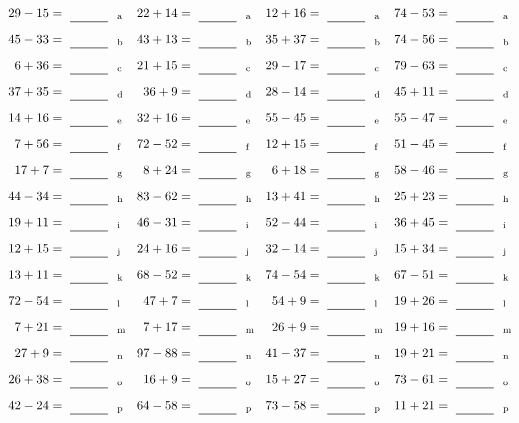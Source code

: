 \documentclass
[
  draft    = true,
  fontsize = 11pt,
  parskip  = half-
]
{scrartcl}
\begin{document}
\clearpage
\begin{align*}
    \pline{29-15}&=\rline{a}
  & \pline{22+14}&=\rline{a}
  & \pline{12+16}&=\rline{a}
  & \pline{74-53}&=\rline{a} \\[1ex]
    \pline{45-33}&=\rline{b}
  & \pline{43+13}&=\rline{b}
  & \pline{35+37}&=\rline{b}
  & \pline{74-56}&=\rline{b} \\[1ex]
    \pline{6+36}&=\rline{c}
  & \pline{21+15}&=\rline{c}
  & \pline{29-17}&=\rline{c}
  & \pline{79-63}&=\rline{c} \\[1ex]
    \pline{37+35}&=\rline{d}
  & \pline{36+9}&=\rline{d}
  & \pline{28-14}&=\rline{d}
  & \pline{45+11}&=\rline{d} \\[1ex]
    \pline{14+16}&=\rline{e}
  & \pline{32+16}&=\rline{e}
  & \pline{55-45}&=\rline{e}
  & \pline{55-47}&=\rline{e} \\[1ex]
    \pline{7+56}&=\rline{f}
  & \pline{72-52}&=\rline{f}
  & \pline{12+15}&=\rline{f}
  & \pline{51-45}&=\rline{f} \\[1ex]
    \pline{17+7}&=\rline{g}
  & \pline{8+24}&=\rline{g}
  & \pline{6+18}&=\rline{g}
  & \pline{58-46}&=\rline{g} \\[1ex]
    \pline{44-34}&=\rline{h}
  & \pline{83-62}&=\rline{h}
  & \pline{13+41}&=\rline{h}
  & \pline{25+23}&=\rline{h} \\[1ex]
    \pline{19+11}&=\rline{i}
  & \pline{46-31}&=\rline{i}
  & \pline{52-44}&=\rline{i}
  & \pline{36+45}&=\rline{i} \\[1ex]
    \pline{12+15}&=\rline{j}
  & \pline{24+16}&=\rline{j}
  & \pline{32-14}&=\rline{j}
  & \pline{15+34}&=\rline{j} \\[1ex]
    \pline{13+11}&=\rline{k}
  & \pline{68-52}&=\rline{k}
  & \pline{74-54}&=\rline{k}
  & \pline{67-51}&=\rline{k} \\[1ex]
    \pline{72-54}&=\rline{l}
  & \pline{47+7}&=\rline{l}
  & \pline{54+9}&=\rline{l}
  & \pline{19+26}&=\rline{l} \\[1ex]
    \pline{7+21}&=\rline{m}
  & \pline{7+17}&=\rline{m}
  & \pline{26+9}&=\rline{m}
  & \pline{19+16}&=\rline{m} \\[1ex]
    \pline{27+9}&=\rline{n}
  & \pline{97-88}&=\rline{n}
  & \pline{41-37}&=\rline{n}
  & \pline{19+21}&=\rline{n} \\[1ex]
    \pline{26+38}&=\rline{o}
  & \pline{16+9}&=\rline{o}
  & \pline{15+27}&=\rline{o}
  & \pline{73-61}&=\rline{o} \\[1ex]
    \pline{42-24}&=\rline{p}
  & \pline{64-58}&=\rline{p}
  & \pline{73-58}&=\rline{p}
  & \pline{11+21}&=\rline{p}
\end{align*}
\end{document}
